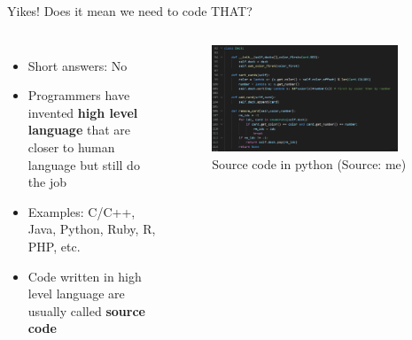 \documentclass[10pt,xcolor={table,dvipsnames},t]{beamer}
\begin{document}
\begin{frame}{Yikes! Does it mean we need to code THAT?}
  \begin{columns}
    \begin{itemize}
      \item Short answers: No
      \item Programmers have invented \textbf{high level language} that are closer to human language but still do the job
      \item Examples: C/C++, Java, Python, Ruby, R, PHP, etc.
      \item Code written in high level language are usually called \textbf{source code}
    \end{itemize}
  

    \begin{figure}
      \includegraphics[width=0.9\textwidth]{img/python-code.png}
      \caption{Source code in python (Source: me)}
      \label{fig:python_code}
    \end{figure}
  \end{columns}
  
\end{frame}
\end{document}
